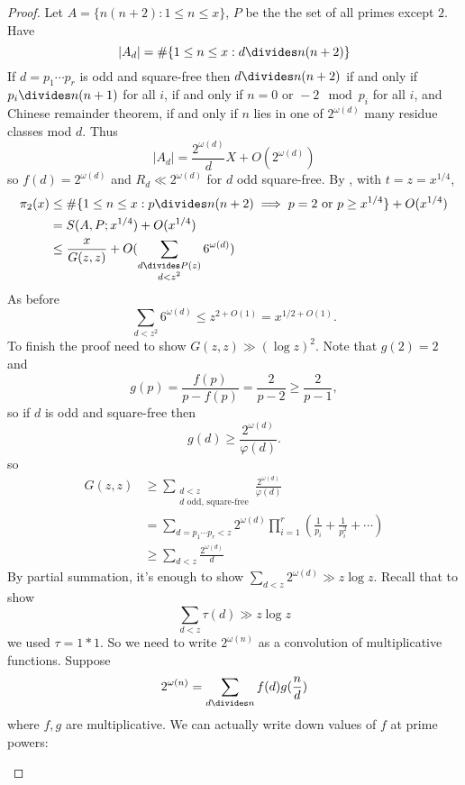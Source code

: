 \documentclass[a4paper]{article}
\begin{document}
\begin{proof}
  Let \(A = \{n (n + 2): 1 \leq n \leq x\}\), \(P\) be the the set of all primes except \(2\). Have
  \[
    |A_d| = \#\{1 \leq n \leq x: d \divides n (n + 2)\}
  \]
  If \(d = p_1 \cdots p_r\) is odd and square-free then \(d \divides n(n + 2)\) if and only if \(p_i \divides n(n + 1)\) for all \(i\), if and only if \(n = 0 \text{ or } -2 \mod p_i\) for all \(i\), and Chinese remainder theorem, if and only if \(n\) lies in one of \(2^{\omega(d)}\) many residue classes mod \(d\). Thus
  \[
    |A_d| = \frac{2^{\omega(d)}}{d} X + O(2^{\omega(d)})
  \]
  so \(f(d) = 2^{\omega(d)}\) and \(R_d \ll 2^{\omega(d)}\) for \(d\) odd square-free. By , with \(t = z = x^{1/4}\),
  \begin{align*}
    \pi_2(x)
    &\leq \#\{1 \leq n \leq x: p \divides n(n + 2) \implies p = 2 \text{ or } p \geq x^{1/4}\} + O(x^{1/4}) \\
    &= S(A, P; x^{1/4}) + O(x^{1/4}) \\
    &\leq \frac{x}{G(z, z)} + O(\sum_{\substack{d \divides P(z) \\ d < z^2}} 6^{\omega(d)})
  \end{align*}
  As before
  \[
    \sum_{d < z^2} 6^{\omega(d)} \leq z^{2 + O(1)} = x^{1/2 + O(1)}.
  \]
  To finish the proof need to show \(G(z, z) \gg (\log z)^2\). Note that \(g(2) = 2\) and 
  \[
    g(p) = \frac{f(p)}{p - f(p)} = \frac{2}{p - 2} \geq \frac{2}{p - 1},
  \]
  so if \(d\) is odd and square-free then
  \[
    g(d) \geq \frac{2^{\omega(d)}}{\varphi(d)}.
  \]
  so
  \begin{align*}
    G(z, z)
    &\geq \sum_{\substack{d < z \\ d \text{ odd, square-free}}} \frac{2^{\omega(d)}}{\varphi(d)} \\
    &= \sum_{d = p_1 \cdots p_r < z} 2^{\omega(d)} \prod_{i = 1}^r \left( \frac{1}{p_i} + \frac{1}{p_i^2} + \cdots \right) \\
    &\geq \sum_{d < z} \frac{2^{\omega(d)}}{d}
  \end{align*}
  By partial summation, it's enough to show \(\sum_{d < z} 2^{\omega(d)} \gg z \log z\). Recall that to show
  \[
    \sum_{d < z} \tau(d) \gg z \log z
  \]
  we used \(\tau = 1 * 1\). So we need to write \(2^{\omega(n)}\) as a convolution of multiplicative functions. Suppose
  \[
    2^{\omega(n)} = \sum_{d \divides n} f(d) g(\frac{n}{d})
  \]
  where \(f, g\) are multiplicative. We can actually write down values of \(f\) at prime powers:
  \begin{enumerate}

\end{enumerate}
\end{proof}
\end{document}
